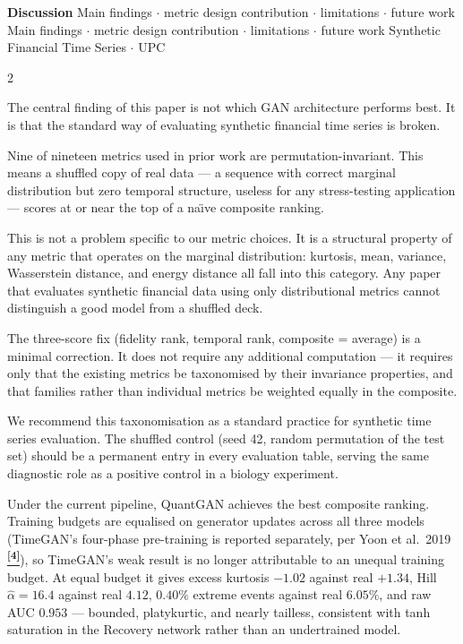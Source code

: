 \documentclass[10pt]{article}
\newcommand{\navybox}[2]{\begin{tcolorbox}[mybox={Navy}{LBg},title={#1}]#2\end{tcolorbox}}
\newcommand{\skybox}[2]{\begin{tcolorbox}[mybox={Sky}{BBg},title={#1}]#2\end{tcolorbox}}
\newcommand{\pagehead}[2]{%
  \begin{tcolorbox}[enhanced,arc=0pt,outer arc=0pt,boxrule=0pt,
    colback=Navy,colframe=Navy,
    top=5pt,bottom=5pt,left=8pt,right=8pt,
    before skip=0pt,after skip=10pt]
  {\color{white}\large\bfseries #1}%
  \ifx\relax#2\relax\else\\[1pt]{\color{blue!30!white}\small #2}\fi
  \hfill{\color{blue!20!white}\footnotesize Synthetic Financial Time Series $\cdot$ UPC}
  \end{tcolorbox}}
\newcommand{\tcite}[1]{%
  \hyperlink{R:#1}{\textsuperscript{\scriptsize\textbf{[#1]}}}}
\begin{document}
\clearpage

\pagehead{Discussion}
         {Main findings $\cdot$ metric design contribution $\cdot$ limitations $\cdot$ future work}

\begin{multicols}{2}

\navybox{The Shuffled-Control Audit as a Methodological Contribution}{%
The central finding of this paper is not which GAN architecture performs best. It is that the standard way of evaluating synthetic financial time series is broken.

Nine of nineteen metrics used in prior work are permutation-invariant. This means a shuffled copy of real data --- a sequence with correct marginal distribution but zero temporal structure, useless for any stress-testing application --- scores at or near the top of a na\"{\i}ve composite ranking.

This is not a problem specific to our metric choices. It is a structural property of any metric that operates on the marginal distribution: kurtosis, mean, variance, Wasserstein distance, and energy distance all fall into this category. Any paper that evaluates synthetic financial data using only distributional metrics cannot distinguish a good model from a shuffled deck.

The three-score fix (fidelity rank, temporal rank, composite = average) is a minimal correction. It does not require any additional computation --- it requires only that the existing metrics be taxonomised by their invariance properties, and that families rather than individual metrics be weighted equally in the composite.

We recommend this taxonomisation as a standard practice for synthetic time series evaluation. The shuffled control (seed 42, random permutation of the test set) should be a permanent entry in every evaluation table, serving the same diagnostic role as a positive control in a biology experiment.}

\skybox{Architecture Comparison and the TimeGAN Result}{%
Under the current pipeline, QuantGAN achieves the best composite ranking. Training budgets are equalised on generator updates across all three models (TimeGAN's four-phase pre-training is reported separately, per Yoon et al.\ 2019\tcite{4}), so TimeGAN's weak result is no longer attributable to an unequal training budget. At equal budget it gives excess kurtosis $-1.02$ against real $+1.34$, Hill $\hat\alpha=16.4$ against real $4.12$, $0.40\%$ extreme events against real $6.05\%$, and raw AUC $0.953$ --- bounded, platykurtic, and nearly tailless, consistent with tanh saturation in the Recovery network rather than an undertrained model.

}
\end{multicols}
\end{document}
